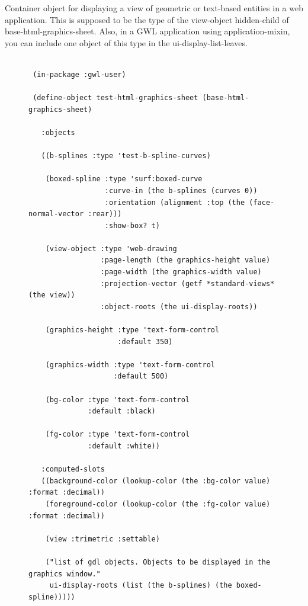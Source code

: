 \documentclass [11pt]{book}
\begin{document}
\begin{itemize}
\begin{description}
Container object for displaying a view of geometric 
or text-based entities in a web application. This is supposed to be the type of the
view-object hidden-child of base-html-graphics-sheet. Also, in a GWL application using 
application-mixin, you can include one object of this type in the ui-display-list-leaves.




\end{description}




\begin{figure}
\begin{lrbox}{\boxedverb}
\begin{minipage}{\linewidth}
{\small

\begin{verbatim}

 (in-package :gwl-user)

 (define-object test-html-graphics-sheet (base-html-graphics-sheet)
    
   :objects 

   ((b-splines :type 'test-b-spline-curves)
   
    (boxed-spline :type 'surf:boxed-curve
                  :curve-in (the b-splines (curves 0))
                  :orientation (alignment :top (the (face-normal-vector :rear)))
                  :show-box? t)

    (view-object :type 'web-drawing
                 :page-length (the graphics-height value)
                 :page-width (the graphics-width value)
                 :projection-vector (getf *standard-views* (the view))
                 :object-roots (the ui-display-roots))
   
    (graphics-height :type 'text-form-control
                     :default 350)
   
    (graphics-width :type 'text-form-control
                    :default 500)
   
    (bg-color :type 'text-form-control
              :default :black)
   
    (fg-color :type 'text-form-control
              :default :white))
     
   :computed-slots
   ((background-color (lookup-color (the :bg-color value) :format :decimal))
    (foreground-color (lookup-color (the :fg-color value) :format :decimal))
     
    (view :trimetric :settable)
   
    ("list of gdl objects. Objects to be displayed in the graphics window."
     ui-display-roots (list (the b-splines) (the boxed-spline)))))


\end{verbatim}}
\end{minipage}
\end{lrbox}
\end{figure}
\end{itemize}
\end{document}
